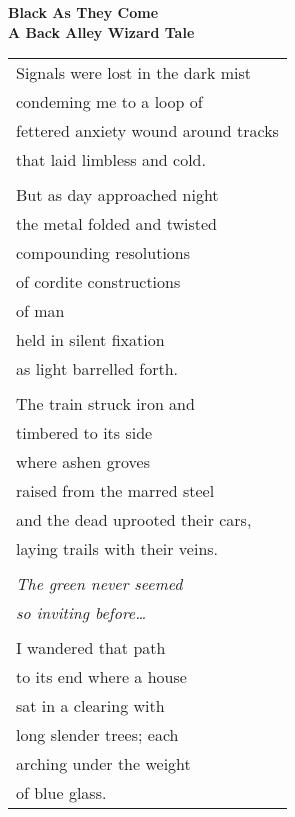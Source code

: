 \documentclass{article}
\begin{document}
\begin{center}
{\Large\textbf{Black As They Come}} \\
{\footnotesize\textbf{A Back Alley Wizard Tale}} \\
\vspace*{2ex}
\begin{tabular}{l}
Signals were lost in the dark mist \\
condeming me to a loop of \\
fettered anxiety wound around tracks \\
that laid limbless and cold. \\
\\
But as day approached night \\
the metal folded and twisted \\
compounding resolutions \\
of cordite constructions \\
of man \\
held in silent fixation \\
as light barrelled forth. \\
\\
The train struck iron and \\
timbered to its side \\
where ashen groves \\
raised from the marred steel \\
and the dead uprooted their cars, \\
laying trails with their veins. \\ %
\\
\hspace*{4ex}\textit{The green never seemed} \\
\hspace*{4ex}\textit{so inviting before\ldots} \\
\\
I wandered that path \\
to its end where a house \\
sat in a clearing with \\
long slender trees; each \\
arching under the weight \\
of blue glass. \\
%
%
%
%
%
%
%
%
\end{tabular}
\end{center}
\end{document}
